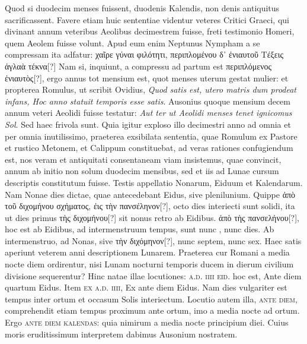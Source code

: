 Quod si duodecim
menses fuissent, duodenis Kalendis, non denis antiquitus sacrificassent.
Favere etiam huic sententiae videntur veteres Critici
Graeci, qui divinant annum veteribus Aeolibus decimestrem fuisse,
freti testimonio Homeri, quem Aeolem fuisse volunt.
Apud eum
enim Neptunus Nympham a se compressam ita adfatur: \textgreek{χαῖρε γύναι
φιλότητι, περιπλομένου δ᾽ ἐνιαυτοῦ Τέξεις ἀγλαὰ τέκνα[?]}\emd
{}Nam si, inquiunt,
a compressu ad partum est \textgreek{περιπλόμενος ἐνιαυτὸς[?]},
 ergo annus tot mensium
est, quot menses uterum gestat mulier: et propterea Romulus,
ut scribit Ovidius, \textit{Quod satis est, utero matris dum prodeat infans,
Hoc anno statuit temporis esse satis}.
Ausonius quoque mensium
decem annum veteri Aeolidi fuisse testatur: \textit{Aut ter ut Aeolidi menses
tenet ignicomus Sol}.
Sed haec frivola sunt.
Quia igitur exploso illo
decimestri anno ad omnia et per omnia inutilissimo, praeterea exsibilata
sententia, quae Romulum ex Pastore et rustico Metonem, et
Calippum constituebat, ad veras rationes confugiendum est, nos
veram et antiquitati consentaneam viam insistemus, quae convincit,
annum ab initio non solum duodecim mensibus, sed et iis ad Lunae
cursum descriptis constitutum fuisse.
Testis appellatio Nonarum,
Eiduum et Kalendarum.
Nam Nonae dies dictae, quae antecedebant
Eidus, sive plenilunium.
Quippe \textgreek{ἀπὸ τοῦ διχομήνου σχήματος, ἐις
τὴν πανσέληνον[?]}, octo dies interiecti sunt solidi, ita ut dies primus
\textgreek{τὴς διχομήνου[?]} sit nonus retro ab Eidibus.
\textgreek{ἀπὸ τὴς πανσελήνου[?]}, hoc est ab
Eidibus, ad intermenstruum tempus, sunt nunc , nunc  dies.
Ab intermenstruo, ad Nonas, sive \textgreek{τὴν διχόμηνον[?]},
 nunc septem,
nunc sex.
Haec satis aperiunt veterem anni descriptionem Lunarem.
Praeterea cur Romani a media nocte diem ordirentur, nisi Lunam
nocturni temporis ducem in dierum civilium divisione sequerentur?
%
Hinc natae illae locutiones: \textsc{a.d. iiii eid.}
 hoc est, Ante diem
quartum Eidus.
Item \textsc{ex a.d. iiii},
 Ex ante diem  Eidus.
Nam
dies vulgariter est tempus inter ortum et occasum Solis interiectum.
Locutio autem illa, \textsc{ante diem}, comprehendit etiam tempus
proximum ante ortum, imo a media nocte ad ortum.
Ergo \textsc{ante
diem kalendas}: quia nimirum a media nocte principium diei.
Cuius moris eruditissimum interpretem dabimus Ausonium nostratem.
